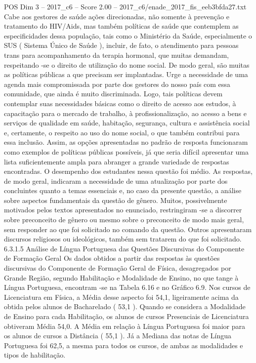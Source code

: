 \begin{textsample}{POS Dim 3 – 2017\_c6 – Score 2.00 – 2017\_c6/enade\_2017\_fis\_eeb3bfda27.txt}
Cabe aos gestores de saúde ações direcionadas, não somente à prevenção e tratamento do HIV/Aids, mas também políticas de saúde que contemplem as especificidades dessa população, tais como o Ministério da Saúde, especialmente o SUS ( Sistema Único de Saúde ), incluir, de fato, o atendimento para pessoas trans para acompanhamento da terapia hormonal, que muitas demandam, respeitando -se o direito de utilização do nome social.
De modo geral, são muitas as políticas públicas a que precisam ser implantadas.
Urge a necessidade de uma agenda mais compromissada por parte dos gestores do nosso país com essa comunidade, que ainda é muito discriminada.
Logo, tais políticas devem contemplar suas necessidades básicas como o direito de acesso aos estudos, à capacitação para o mercado de trabalho, à profissionalização, ao acesso a bens e serviços de qualidade em saúde, habitação, segurança, cultura e assistência social e, certamente, o respeito ao uso do nome social, o que também contribui para essa inclusão.
Assim, as opções apresentadas no padrão de resposta funcionaram como exemplos de políticas públicas possíveis, já que seria difícil apresentar uma lista suficientemente ampla para abranger a grande variedade de respostas encontradas.
O desempenho dos estudantes nessa questão foi médio.
As respostas, de modo geral, indicaram a necessidade de uma atualização por parte dos concluintes quanto a temas essenciais e, no caso da presente questão, a análise sobre aspectos fundamentais da questão de gênero.
Muitos, possivelmente motivados pelos textos apresentados no enunciado, restringiram -se a discorrer sobre preconceito de gênero ou mesmo sobre o preconceito de modo mais geral, sem responder ao que foi solicitado no comando da questão.
Outros apresentaram discursos religiosos ou ideológicos, também sem tratarem do que foi solicitado. 6.3.1.5 Análise de Língua Portuguesa das Questões Discursivas do Componente de Formação Geral Os dados obtidos a partir das respostas às questões discursivas do Componente de Formação Geral de Física, desagregados por Grande Região, segundo Habilitação e Modalidade de Ensino, no que tange à Língua Portuguesa, encontram -se na Tabela 6.16 e no Gráfico 6.9.
Nos cursos de Licenciatura em Física, a Média desse aspecto foi 54,1, ligeiramente acima da obtida pelos alunos de Bacharelado ( 53,1 ).
Quando se considera a Modalidade de Ensino para cada Habilitação, os alunos de cursos Presenciais de Licenciatura obtiveram Média 54,0.
A Média em relação à Língua Portuguesa foi maior para os alunos de cursos a Distância ( 55,1 ).
Já a Mediana das notas de Língua Portuguesa foi 62,5, a mesma para todos os cursos, de ambas as modalidades e tipos de habilitação.

\end{textsample}
